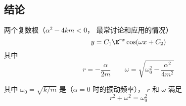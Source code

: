 
\subsection{结论}
两个复数根（$\alpha ^2 - 4km < 0$， 最常讨论和应用的情况）
\begin{equation}
y = C_1 \E^{rx} \cos(\omega x + C_2)
\end{equation}
其中
\begin{equation}
r =  - \frac{\alpha }{2m} \qquad  \omega  = \sqrt{\omega_0^2 - \frac{\alpha ^2}{4 m^2}}
\end{equation}

其中 $\omega_0 = \sqrt{k/m}$ 是（$\alpha  = 0$ 时的振动频率）， $r$ 和 $\omega$ 满足
\begin{equation}
r^2 + \omega ^2 = \omega_0^2
\end{equation}


